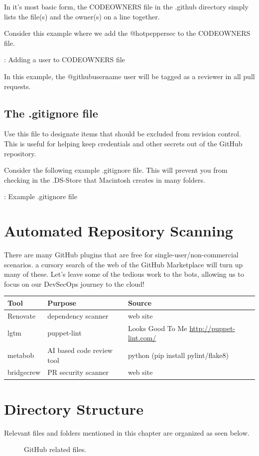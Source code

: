 \justify{}
In it's most basic form, the CODEOWNERS file in the .github directory
simply lists the file(s) and the owner(s) on a line together.

\justify{}
Consider this example where we add the @hotpeppersec to the CODEOWNERS file.

\begin{mybox}{\thetcbcounter: Adding a user to CODEOWNERS file}
      
\end{mybox}

\justify{}
In this example, the @githubusername user will be tagged as a reviewer in all pull requests.

\subsection{The .gitignore file}

\justify{}
Use this file to designate items that should be excluded from revision
control. This is useful for helping keep credentials and other secrets out of the GitHub repository.

\justify{}
Consider the following example .gitignore file. This will prevent you from checking in the .DS-Store that
Macintosh creates in many folders.

\begin{mybox}{\thetcbcounter: Example .gitignore file}
      
\end{mybox}

\section{Automated Repository Scanning}

\justify{}
There are many GitHub plugins that are free for single-user/non-commercial scenarios. a cursory search of the web of the
GitHub Marketplace will turn up many of these. Let's leave some of the
tedious work to the bots, allowing us to focus on our DevSecOps journey to the cloud!

\justify{}
\begin{tabular}{| p{2.3cm}| p{4.5cm} | p{8.5cm} |}
      \hline
     \textbf{Tool}& \textbf{Purpose}& \textbf{Source} \\
      \hline
      Renovate & dependency scanner & web site \\
      \hline
      lgtm & puppet-lint & Looks Good To Me \url{http://puppet-lint.com/} \\
      \hline
      metabob & AI based code review tool & python (pip install pylint/flake8) \\
      \hline
      bridgecrew & PR security scanner & web site \\
      \hline
\end{tabular}

\section{Directory Structure}

\justify{}
Relevant files and folders mentioned in this chapter are organized as
seen below.

\begin{figure}[!htb]
      \centering
      
      \caption{GitHub related files.}
      \label{githubfiles}
\end{figure}
